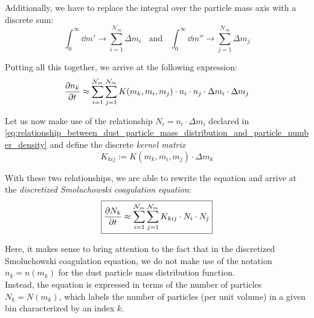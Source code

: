         Additionally, we have to replace the integral over the particle mass axis 
        with a discrete sum:
        \begin{equation}
            \int_0^\infty \dd m' \to \sum_{i=1}^{\mathcal N_m} \Delta m_i
            \ \ \ \ \text{and}\ \ \ \
            \int_0^\infty \dd m'' \to \sum_{j=1}^{\mathcal N_m} \Delta m_j
        \end{equation} 

        Putting all this together, we arrive at the following expression:
        \begin{equation}
            \label{eq:discrete_smoluchowski_equation}
            \frac{\partial n_k}{\partial t}
                \approx \sum_{i=1}^{\mathcal N_m}\sum_{j=1}^{\mathcal N_m}
                    K(m_k,m_i,m_j)\cdot n_i\cdot n_j\cdot\Delta m_i\cdot\Delta m_j
        \end{equation}
    
        Let us now make use of the relationship $N_i=n_i \cdot \Delta m_i$ declared in 
        \cref{eq:relationship_between_dust_particle_mass_distribution_and_particle_number_density}
        and define the discrete \textit{kernel matrix}
        \begin{equation}
            \boxed{
                K_{kij} := K(m_k,m_i,m_j) \cdot \Delta m_k
            }
        \end{equation}

        With these two relationships, we are able to rewrite the equation and
        arrive at the \textit{discretized Smoluchowski coagulation equation}:
        \begin{equation}
            \boxed{
            \frac{\partial N_k}{\partial t}
                \approx \sum_{i=1}^{\mathcal N_m}\sum_{j=1}^{\mathcal N_m} K_{kij}\cdot N_i\cdot N_j
            }
        \end{equation}

        Here, it makes sense to bring attention to the fact that in the discretized Smoluchowski
        coagulation equation, we do not make use of the notation $n_k = n(m_k)$ for the dust
        particle mass distribution function. \\

        Instead, the equation is expressed in terms of the 
        number of particles $N_k = N(m_k)$, which labels the number of particles (per unit volume) 
        in a given bin characterized by an index $k$.

